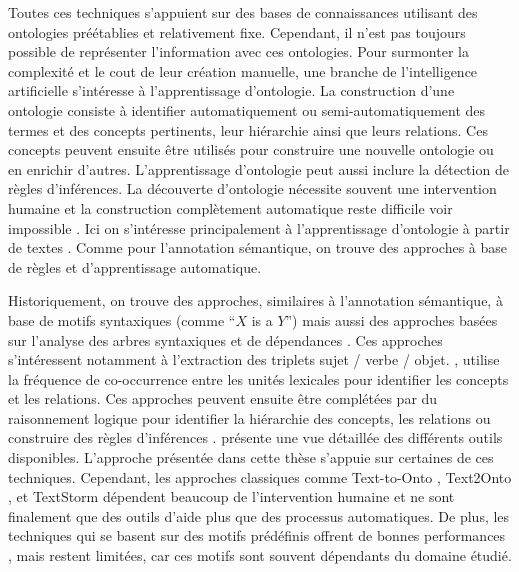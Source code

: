 Toutes ces techniques s'appuient sur des bases de connaissances utilisant des ontologies préétablies et relativement fixe.
Cependant, il n'est pas toujours possible de représenter l'information avec ces ontologies.
Pour surmonter la complexité et le cout de leur création manuelle, une branche de l'intelligence artificielle s'intéresse à l'apprentissage d'ontologie.
La construction d'une ontologie consiste à identifier automatiquement ou semi-automatiquement des termes et des concepts pertinents, leur hiérarchie ainsi que leurs relations.
Ces concepts peuvent ensuite être utilisés pour construire une nouvelle ontologie ou en enrichir d'autres.
L'apprentissage d'ontologie peut aussi inclure la détection de règles d'inférences.
La découverte d'ontologie nécessite souvent une intervention humaine \cite{navarro-almanzaAutomatedOntologyExtraction2020} et la construction complètement automatique reste difficile voir impossible \cite{hazmanSurveyOntologyLearning2011,wongOntologyLearningText2012,browarnikOntologyLearningText2015}.
Ici on s'intéresse principalement à l'apprentissage d'ontologie à partir de textes \cite{konysKnowledgeRepositoryOntology2019,watrobskiOntologyLearningMethods2020,al-aswadiAutomaticOntologyConstruction2020}.
Comme pour l'annotation sémantique, on trouve des approches à base de règles et d'apprentissage automatique.

Historiquement, on trouve des approches, similaires à l'annotation sémantique, à base de motifs syntaxiques (comme \enquote{$X$ is a $Y$}) \cite{morinAutomaticAcquisitionSemantic1999} mais aussi des approches basées sur l'analyse des arbres syntaxiques et de dépendances \cite{gamalloMappingSyntacticDependencies2002,nivreIncrementalityDeterministicDependency2004}.
Ces approches s'intéressent notamment à l'extraction des triplets sujet / verbe / objet.
\cite{budanitskyLexicalSemanticRelatedness1999}, utilise la fréquence de co-occurrence entre les unités lexicales pour identifier les concepts et les relations.
Ces approches peuvent ensuite être complétées par du raisonnement logique pour identifier la hiérarchie des concepts, les relations ou construire des règles d'inférences \cite{zelleLearningSemanticGrammars1993}.
\cite{al-aswadiAutomaticOntologyConstruction2020} présente une vue détaillée des différents outils disponibles.
L'approche présentée dans cette thèse s'appuie sur certaines de ces techniques.
Cependant, les approches classiques comme {Text-to-Onto} \cite{maedcheTexttoontoOntologyExtraction2001}, {Text2Onto} \cite{cimianoText2Onto2005}, et {TextStorm} \cite{alvesAutomaticReadingLearning2002} dépendent beaucoup de l'intervention humaine et ne sont finalement que des outils d'aide plus que des processus automatiques.
De plus, les techniques qui se basent sur des motifs prédéfinis offrent de bonnes performances \cite{savaryRelationExtractionClinical2022}, mais restent limitées, car ces motifs sont souvent dépendants du domaine étudié.

